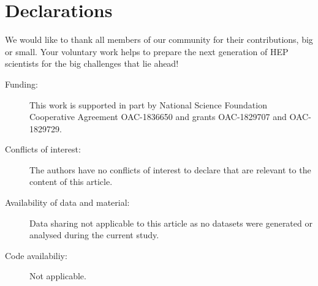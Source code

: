 \documentclass[twocolumn]{svjour3}          %
\begin{document}
\section*{Declarations}
We would like to thank all members of our community for their contributions, big or small. Your voluntary work helps to prepare the next generation of HEP scientists for the big challenges that lie ahead!

\begin{description}
\item[Funding:] This work is supported in part by National Science Foundation Cooperative Agreement OAC-1836650 and grants OAC-1829707 and OAC-1829729.
\item[Conflicts of interest:] The authors have no conflicts of interest to declare that are relevant to the content of this article.
\item[Availability of data and material:] Data sharing not applicable to this article as no datasets were generated or analysed during the current study.
\item[Code availabiliy:] Not applicable.
\end{description}
\end{document}
